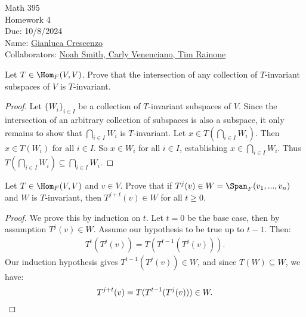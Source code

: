 \documentclass[10pt,twoside,openany]{memoir}
\begin{document}
\begin{center}
    { \Large Math 395 \\[0.1in]Homework 4 \\[0.1in]
    Due: 10/8/2024}\\[.25in]
    { Name:} {\underline{Gianluca Crescenzo\hspace*{2in}}}\\[0.15in]
    { Collaborators:} {\underline{Noah Smith, Carly Venenciano, Tim Rainone \hspace*{2in}}} \\
    \end{center}
    \vspace{4pt}
    \begin{exercise}
        Let $T \in \Hom_F{(V,V)}$. Prove that the intersection of any collection of $T$-invariant subspaces of $V$ is $T$-invariant.
    \end{exercise}
        \begin{proof}
            Let $\{W_i\}_{i \in I}$ be a collection of $T$-invariant subspaces of $V$. Since the intersection of an arbitrary collection of subspaces is also a subspace, it only remains to show that $\bigcap_{i \in I}W_i$ is $T$-invariant. Let $x \in T \left(\bigcap_{i \in I}W_i\right)$. Then $x \in T(W_i)$ for all $i \in I$. So $x \in W_i$ for all $i \in I$, establishing $x \in \bigcap_{i \in I}W_i$. Thus $T \left(\bigcap_{i \in I}W_i\right) \subseteq \bigcap_{i \in I}W_i$.
        \end{proof}
    \begin{exercise}
        Let $T \in \Hom_F{(V,V)}$ and $v \in V$. Prove that if $T^j(v) \in W = \Span_F{(v_1,...,v_n)}$ and $W$ is $T$-invariant, then $T^{j+t}(v) \in W$ for all $t \geq 0$.
    \end{exercise}
        \begin{proof}
            We prove this by induction on $t$. Let $t = 0$ be the base case, then by assumption $T^j(v) \in W$. Assume our hypothesis to be true up to $t - 1$. Then:
                \begin{equation*}
                \begin{split}
                    T^t(T^j(v)) = T(T^{t-1}(T^j(v))).
                \end{split}
                \end{equation*}
            Our induction hypothesis gives $T^{t-1}(T^j(v)) \in W$, and since $T(W) \subseteq W$, we have:
                \begin{equation*}
                    T^{j+t}(v) = T(T^{t-1}(T^j(v))) \in W.\qedhere
                \end{equation*}
        \end{proof}
\end{document}
